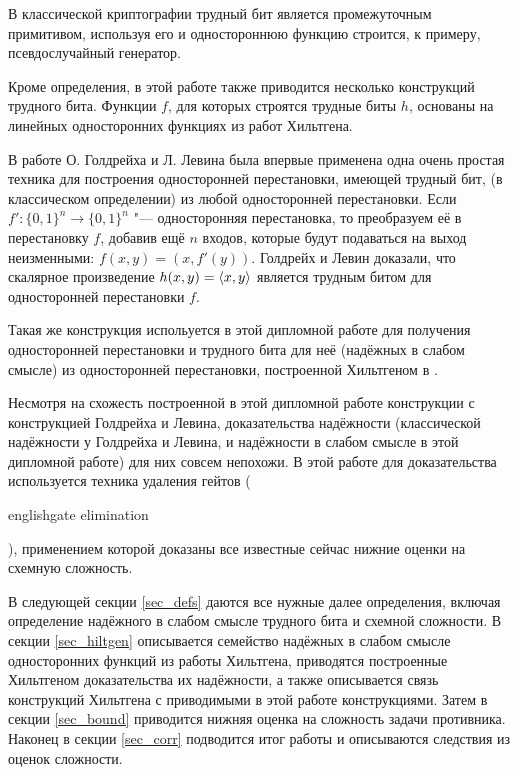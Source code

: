 \documentclass[a4paper, 14pt]{extarticle}
\begin{document}
В классической криптографии трудный бит является промежуточным примитивом,
используя его и одностороннюю функцию строится, к примеру, псевдослучайный
генератор.

Кроме определения, в этой работе также приводится несколько конструкций трудного
бита. Функции $f$, для которых строятся трудные биты $h$, основаны на линейных
односторонних функциях из работ Хильтгена.

В работе О. Голдрейха и Л. Левина \cite{goldreich_levin} была впервые применена
одна очень простая техника для построения односторонней перестановки, имеющей
трудный бит, (в классическом определении) из любой односторонней перестановки.
Если $f' : \{0, 1\}^n \to \{0, 1\}^n$ "--- односторонняя перестановка, то
преобразуем её в перестановку $f$, добавив ещё $n$ входов, которые будут
подаваться на выход неизменными: $f(x, y) = (x, f'(y))$. Голдрейх и Левин
доказали, что скалярное произведение $h(x, y) = \langle x, y\rangle$ является трудным
битом для односторонней перестановки $f$.

Такая же конструкция испольуется в этой дипломной работе для получения
односторонней перестановки и трудного бита для неё (надёжных в слабом смысле) из
односторонней перестановки, построенной Хильтгеном в \cite{hiltgen1993}.

Несмотря на схожесть построенной в этой дипломной работе конструкции с
конструкцией Голдрейха и Левина, доказательства надёжности (классической
надёжности у Голдрейха и Левина, и надёжности в слабом смысле в этой
дипломной работе) для них совсем непохожи. В этой работе для доказательства
используется техника удаления гейтов (\begin{foreignlanguage}{english}gate
elimination\end{foreignlanguage}), применением которой доказаны все известные
сейчас нижние оценки на схемную сложность.

В следующей секции \ref{sec_defs} даются все нужные далее определения, включая
определение надёжного в слабом смысле трудного бита и схемной сложности.
В секции \ref{sec_hiltgen} описывается семейство надёжных в слабом смысле
односторонних функций из работы Хильтгена, приводятся построенные Хильтгеном
доказательства их надёжности, а также описывается связь конструкций Хильтгена
с приводимыми в этой работе конструкциями. Затем в секции \ref{sec_bound}
приводится нижняя оценка на сложность задачи противника. Наконец в секции
\ref{sec_corr} подводится итог работы и описываются следствия из оценок
сложности.
\end{document}
